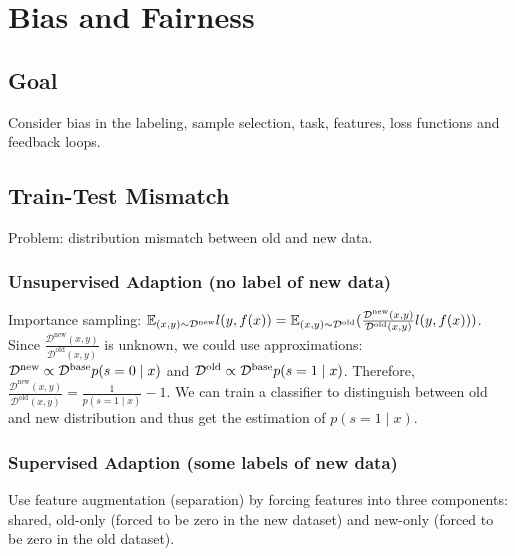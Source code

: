 \section{Bias and Fairness}

\subsection*{Goal}

Consider bias in the labeling, sample selection, task, features, loss functions and feedback loops.

\subsection*{Train-Test Mismatch}

Problem: distribution mismatch between old and new data.

\subsubsection*{Unsupervised Adaption (no label of new data)}
Importance sampling: $\mathbb{E}_{(x,y)\sim \mathcal{D}^{\text{new}}} l(y, f(x)) = \mathbb{E}_{(x,y)\sim \mathcal{D}^{\text{old}}} (\frac{\mathcal{D}^{\text{new}}(x,y)}{\mathcal{D}^{\text{old}}(x,y)}l(y,f(x)))$. Since $\frac{\mathcal{D}^{\text{new}}(x,y)}{\mathcal{D}^{\text{old}}(x,y)}$ is unknown, we could use approximations: $\mathcal{D}^{\text{new}} \propto \mathcal{D}^{\text{base}}p(s=0\mid x)$ and $\mathcal{D}^{\text{old}} \propto \mathcal{D}^{\text{base}}p(s=1\mid x)$. Therefore, $\frac{\mathcal{D}^{\text{new}}(x,y)}{\mathcal{D}^{\text{old}}(x,y)} = \frac{1}{p(s=1\mid x)}-1$. We can train a classifier to distinguish between old and new distribution and thus get the estimation of $p(s=1\mid x)$.

\subsubsection*{Supervised Adaption (some labels of new data)}

Use feature augmentation (separation) by forcing features into three components: shared, old-only (forced to be zero in the new dataset) and new-only (forced to be zero in the old dataset).